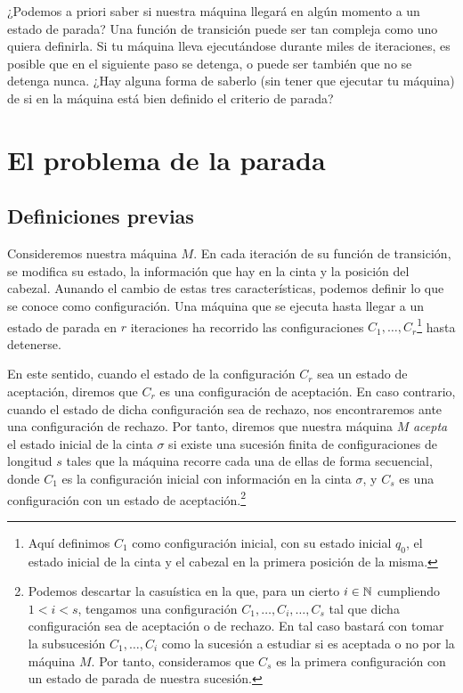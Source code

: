 ¿Podemos a priori saber si nuestra máquina llegará en algún momento a un estado de parada?
Una función de transición puede ser tan compleja como uno quiera definirla. Si tu máquina lleva ejecutándose durante miles de iteraciones, es posible que en el siguiente paso se detenga, o puede ser también que no se detenga
nunca. ¿Hay alguna forma de saberlo (sin tener que ejecutar tu máquina) de si en la máquina está bien definido el criterio de parada?

\section{El problema de la parada}

\subsection{Definiciones previas}

Consideremos nuestra máquina $M$. En cada iteración de su función de transición, se modifica su estado, la información que hay en la cinta y la posición del cabezal. Aunando el cambio de estas tres características, podemos 
definir lo que se conoce como configuración. Una máquina que se ejecuta hasta llegar a un estado de parada en $r$ iteraciones ha recorrido las configuraciones $C_1, \dots, C_r$\footnote{Aquí definimos $C_1$ como configuración 
inicial, con su estado inicial $q_0$, el estado inicial de la cinta y el cabezal en la primera posición de la misma.} hasta detenerse. 

En este sentido, cuando el estado de la configuración $C_r$ sea un estado de aceptación, diremos que $C_r$ es una configuración de aceptación. En caso contrario, cuando el estado de dicha configuración sea de rechazo, 
nos encontraremos ante una configuración de rechazo. Por tanto, diremos que nuestra máquina $M$ \textit{acepta} el estado inicial de la cinta $\sigma$ si existe una sucesión finita de configuraciones de longitud $s$ tales 
que la máquina recorre cada una de ellas de forma secuencial, donde $C_1$ es la configuración inicial con información en la cinta $\sigma$, y $C_s$ es una configuración con un estado de aceptación.\footnote{Podemos
descartar la casuística en la que, para un cierto $i \in \mathbb{N}$ cumpliendo $1 < i < s$, tengamos una configuración $C_1, \dots, C_i, \dots, C_s$ tal que dicha configuración sea de aceptación o de rechazo. En tal caso 
bastará con tomar la subsucesión $C_1, \dots, C_i$ como la sucesión a estudiar si es aceptada o no por la máquina $M$. Por tanto, consideramos que $C_s$ es la primera configuración con un estado de parada de nuestra sucesión.}

